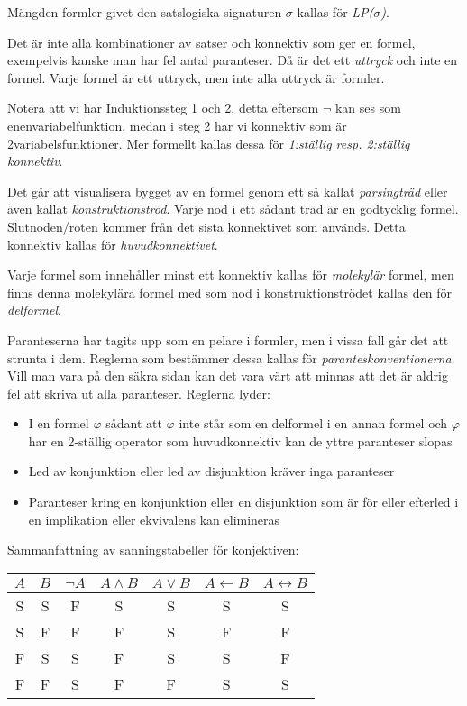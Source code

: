 \noindent Mängden formler givet den satslogiska signaturen $\sigma$ kallas för \textit{LP($\sigma$)}.

\noindent Det är inte alla kombinationer av satser och konnektiv som ger en formel, exempelvis kanske man har fel antal paranteser. Då är det ett \textit{uttryck} och inte en formel. Varje formel är ett uttryck, men inte alla uttryck är formler.
\par\bigskip

\noindent Notera att vi har Induktionssteg 1 och 2, detta eftersom $\neg$ kan ses som enenvariabelfunktion, medan i steg 2 har vi konnektiv som är 2variabelsfunktioner. Mer formellt kallas dessa för \textit{1:ställig resp. 2:ställig konnektiv}.
\par\bigskip
\noindent Det går att visualisera bygget av en formel genom ett så kallat \textit{parsingträd} eller även kallat \textit{konstruktionströd}. Varje nod i ett sådant träd är en godtycklig formel. Slutnoden/roten kommer från det sista konnektivet som används. Detta konnektiv kallas för \textit{huvudkonnektivet}.
\par\bigskip
\noindent Varje formel som innehåller minst ett konnektiv kallas för \textit{molekylär} formel, men finns denna molekylära formel med som nod i konstruktionströdet kallas den för \textit{delformel}.
\par\bigskip
\noindent Paranteserna har tagits upp som en pelare i formler, men i vissa fall går det att strunta i dem. Reglerna som bestämmer dessa kallas för \textit{paranteskonventionerna}. Vill man vara på den säkra sidan kan det vara värt att minnas att det är aldrig fel att skriva ut alla paranteser. Reglerna lyder:
\begin{itemize}
  \item I en formel $\varphi$ sådant att $\varphi$ inte står som en delformel i en annan formel och $\varphi$ har en 2-ställig operator som huvudkonnektiv kan de yttre paranteser slopas
  \item Led av konjunktion eller led av disjunktion kräver inga paranteser
  \item Paranteser kring en konjunktion eller en disjunktion som är för eller efterled i en implikation eller ekvivalens kan elimineras 
\end{itemize}
\par\bigskip
\noindent Sammanfattning av sanningstabeller för konjektiven:
\par\bigskip

\begin{center}
  \begin{tabular}{c c | c c c c c }
    $A$&$B$&$\neg A$&$A\wedge B$&$A\vee B$&$A\leftarrow B$&$A\leftrightarrow B$\\
    \hline
    S&S&F&S&S&S&S\\
    S&F&F&F&S&F&F\\
    F&S&S&F&S&S&F\\
    F&F&S&F&F&S&S
  \end{tabular}
\end{center}


